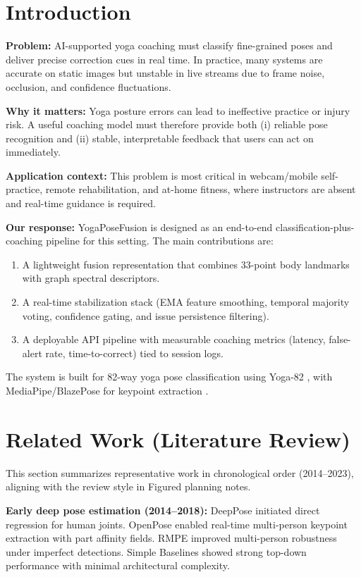 \documentclass[conference]{IEEEtran}
\begin{document}
\section{Introduction}
\textbf{Problem:} AI-supported yoga coaching must classify fine-grained poses and deliver precise correction cues in real time. In practice, many systems are accurate on static images but unstable in live streams due to frame noise, occlusion, and confidence fluctuations.

\textbf{Why it matters:} Yoga posture errors can lead to ineffective practice or injury risk. A useful coaching model must therefore provide both (i) reliable pose recognition and (ii) stable, interpretable feedback that users can act on immediately.

\textbf{Application context:} This problem is most critical in webcam/mobile self-practice, remote rehabilitation, and at-home fitness, where instructors are absent and real-time guidance is required.

\textbf{Our response:} YogaPoseFusion is designed as an end-to-end classification-plus-coaching pipeline for this setting. The main contributions are:
\begin{enumerate}
\item A lightweight fusion representation that combines 33-point body landmarks with graph spectral descriptors.
\item A real-time stabilization stack (EMA feature smoothing, temporal majority voting, confidence gating, and issue persistence filtering).
\item A deployable API pipeline with measurable coaching metrics (latency, false-alert rate, time-to-correct) tied to session logs.
\end{enumerate}

The system is built for 82-way yoga pose classification using Yoga-82 \cite{verma2020yoga82}, with MediaPipe/BlazePose for keypoint extraction \cite{lugaresi2019mediapipe,bazarevsky2020blazepose}.

\section{Related Work (Literature Review)}
This section summarizes representative work in chronological order (2014--2023), aligning with the review style in Figured planning notes.

\textbf{Early deep pose estimation (2014--2018):} DeepPose \cite{toshev2014deeppose} initiated direct regression for human joints. OpenPose \cite{cao2017realtime} enabled real-time multi-person keypoint extraction with part affinity fields. RMPE \cite{fang2017rmpe} improved multi-person robustness under imperfect detections. Simple Baselines \cite{xiao2018simple} showed strong top-down performance with minimal architectural complexity.
\end{document}

